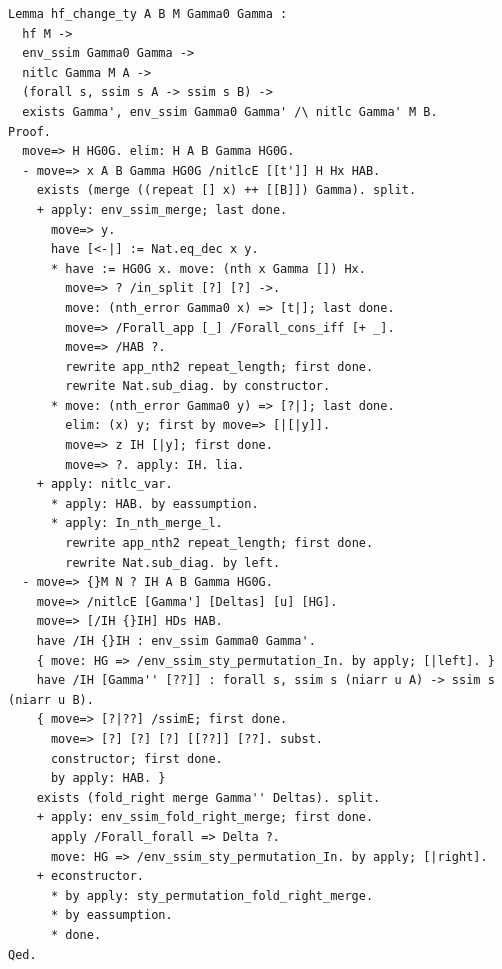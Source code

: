 \begin{lstlisting}[style=authorcoq]
Lemma hf_change_ty A B M Gamma0 Gamma :
  hf M ->
  env_ssim Gamma0 Gamma ->
  nitlc Gamma M A ->
  (forall s, ssim s A -> ssim s B) ->
  exists Gamma', env_ssim Gamma0 Gamma' /\ nitlc Gamma' M B.
Proof.
  move=> H HG0G. elim: H A B Gamma HG0G.
  - move=> x A B Gamma HG0G /nitlcE [[t']] H Hx HAB.
    exists (merge ((repeat [] x) ++ [[B]]) Gamma). split.
    + apply: env_ssim_merge; last done.
      move=> y.
      have [<-|] := Nat.eq_dec x y.
      * have := HG0G x. move: (nth x Gamma []) Hx.
        move=> ? /in_split [?] [?] ->.
        move: (nth_error Gamma0 x) => [t|]; last done.
        move=> /Forall_app [_] /Forall_cons_iff [+ _].
        move=> /HAB ?.
        rewrite app_nth2 repeat_length; first done.
        rewrite Nat.sub_diag. by constructor.
      * move: (nth_error Gamma0 y) => [?|]; last done.
        elim: (x) y; first by move=> [|[|y]].
        move=> z IH [|y]; first done.
        move=> ?. apply: IH. lia.
    + apply: nitlc_var.
      * apply: HAB. by eassumption.
      * apply: In_nth_merge_l.
        rewrite app_nth2 repeat_length; first done.
        rewrite Nat.sub_diag. by left.
  - move=> {}M N ? IH A B Gamma HG0G.
    move=> /nitlcE [Gamma'] [Deltas] [u] [HG].
    move=> [/IH {}IH] HDs HAB.
    have /IH {}IH : env_ssim Gamma0 Gamma'.
    { move: HG => /env_ssim_sty_permutation_In. by apply; [|left]. }
    have /IH [Gamma'' [??]] : forall s, ssim s (niarr u A) -> ssim s (niarr u B).
    { move=> [?|??] /ssimE; first done.
      move=> [?] [?] [?] [[??]] [??]. subst.
      constructor; first done.
      by apply: HAB. }
    exists (fold_right merge Gamma'' Deltas). split.
    + apply: env_ssim_fold_right_merge; first done.
      apply /Forall_forall => Delta ?.
      move: HG => /env_ssim_sty_permutation_In. by apply; [|right].
    + econstructor.
      * by apply: sty_permutation_fold_right_merge.
      * by eassumption.
      * done.
Qed.


\end{lstlisting}
